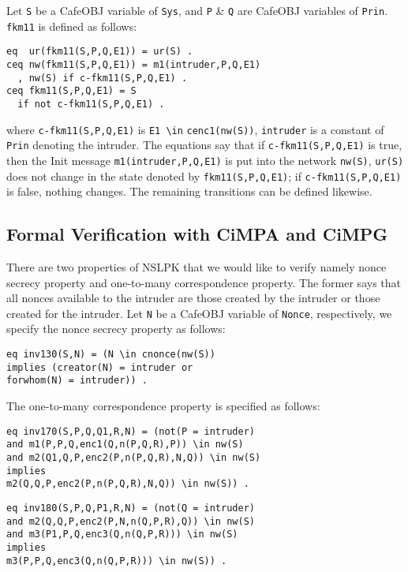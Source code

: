 \documentclass[10pt, conference, compsocconf]{IEEEtran}
\begin{document}
Let \verb!S! be a CafeOBJ variable of \verb!Sys!, and \verb!P! \& \verb!Q! are CafeOBJ variables of \verb!Prin!.
\verb!fkm11! is defined as follows:
\begin{small}
	\begin{verbatim}
eq  ur(fkm11(S,P,Q,E1)) = ur(S) .
ceq nw(fkm11(S,P,Q,E1)) = m1(intruder,P,Q,E1)
  , nw(S) if c-fkm11(S,P,Q,E1) .
ceq fkm11(S,P,Q,E1) = S 
  if not c-fkm11(S,P,Q,E1) .
	\end{verbatim}
\end{small}

\noindent
where \verb!c-fkm11(S,P,Q,E1)! is \verb!E1 \in! \verb!cenc1(nw(S))!, 
\verb!intruder! is a constant of \verb!Prin! denoting the intruder. The equations say that if \verb!c-fkm11(S,P,Q,E1)! is true, then the Init message \verb!m1(intruder,P,Q,E1)! is put into the network \verb!nw(S)!, \verb!ur(S)! does not change in the state denoted by \verb!fkm11(S,P,Q,E1)!; if \verb!c-fkm11(S,P,Q,E1)! is false, nothing changes. The remaining transitions can be defined likewise.



\subsection{Formal Verification with CiMPA and CiMPG}
There are two properties of NSLPK that we would like to verify namely nonce secrecy property and one-to-many correspondence property.
The former says that all nonces available to the intruder are those created by the intruder or those created for the intruder. Let \verb!N! be a CafeOBJ variable of \verb!Nonce!, respectively, we specify the nonce secrecy property as follows:

\begin{small}
	\begin{verbatim}
eq inv130(S,N) = (N \in cnonce(nw(S)) 
implies (creator(N) = intruder or 
forwhom(N) = intruder)) .
	\end{verbatim}
\end{small}

The one-to-many correspondence property is specified as follows:
\begin{small}
	\begin{verbatim}
eq inv170(S,P,Q,Q1,R,N) = (not(P = intruder)
and m1(P,P,Q,enc1(Q,n(P,Q,R),P)) \in nw(S) 
and m2(Q1,Q,P,enc2(P,n(P,Q,R),N,Q)) \in nw(S)
implies 
m2(Q,Q,P,enc2(P,n(P,Q,R),N,Q)) \in nw(S)) .
	\end{verbatim}
\end{small}
\begin{small}
	\begin{verbatim}
eq inv180(S,P,Q,P1,R,N) = (not(Q = intruder)
and m2(Q,Q,P,enc2(P,N,n(Q,P,R),Q)) \in nw(S)
and m3(P1,P,Q,enc3(Q,n(Q,P,R))) \in nw(S)
implies
m3(P,P,Q,enc3(Q,n(Q,P,R))) \in nw(S)) .
	\end{verbatim}
\end{small}
\end{document}
